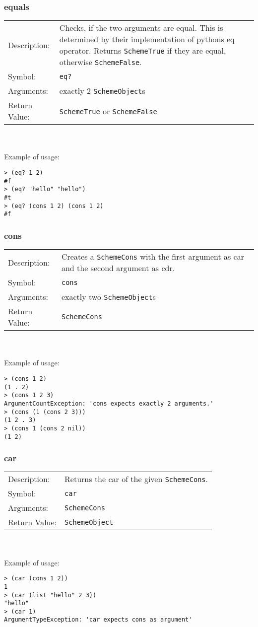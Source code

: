 \documentclass[12pt,a4paper]{scrartcl}
\begin{document}
\subsubsection{equals}
\begin{tabular}{l  p{13cm}}
Description: & Checks, if the two arguments are equal. This is determined by their implementation of pythons eq operator. Returns \lstinline{SchemeTrue} if they are equal, otherwise \lstinline{SchemeFalse}. \\
Symbol: & \lstinline{eq?}\\
Arguments: & exactly 2 \lstinline{SchemeObject}s\\
Return Value: & \lstinline{SchemeTrue} or \lstinline{SchemeFalse}
\end{tabular}
\\
\\
Example of usage:
\begin{lstlisting}
> (eq? 1 2)
#f
> (eq? "hello" "hello")
#t
> (eq? (cons 1 2) (cons 1 2)
#f
\end{lstlisting}

\subsubsection{cons}
\begin{tabular}{l  p{13cm}}
Description: & Creates a \lstinline{SchemeCons} with the first argument as car and the second argument as cdr.\\
Symbol: & \lstinline{cons}\\
Arguments: & exactly two \lstinline{SchemeObject}s\\
Return Value: & \lstinline{SchemeCons}
\end{tabular}
\\
\\
Example of usage:
\begin{lstlisting}
> (cons 1 2)
(1 . 2)
> (cons 1 2 3)
ArgumentCountException: 'cons expects exactly 2 arguments.'  
> (cons (1 (cons 2 3)))
(1 2 . 3)
> (cons 1 (cons 2 nil))
(1 2)
\end{lstlisting}

\subsubsection{car}
\begin{tabular}{l  p{13cm}}
Description: & Returns the car of the given \lstinline{SchemeCons}.\\
Symbol: & \lstinline{car}\\
Arguments: & \lstinline{SchemeCons}\\
Return Value: & \lstinline{SchemeObject}
\end{tabular}
\\
\\
Example of usage:
\begin{lstlisting}
> (car (cons 1 2))
1
> (car (list "hello" 2 3))
"hello"
> (car 1)
ArgumentTypeException: 'car expects cons as argument'   
\end{lstlisting}
\end{document}
